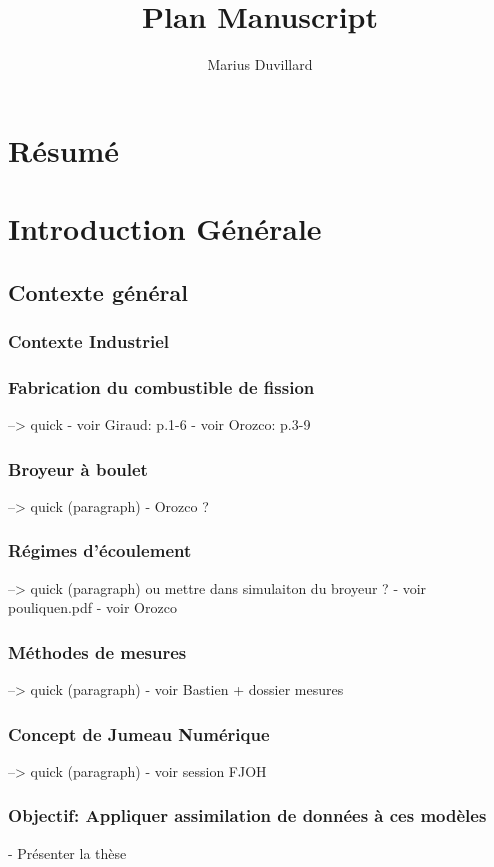 \documentclass{article}
\title{Plan Manuscript}
\author{Marius Duvillard}
\begin{document}
\maketitle
\tableofcontents
\newpage

\section{Résumé}
\section{Introduction Générale}
\subsection{Contexte général}
\subsubsection{Contexte Industriel}
\subsubsection{Fabrication du combustible de fission} --> quick
- voir Giraud: p.1-6
- voir Orozco: p.3-9
\subsubsection{Broyeur à boulet} --> quick (paragraph)
- Orozco ?
\subsubsection{Régimes d'écoulement} --> quick (paragraph) ou mettre dans simulaiton du broyeur ?
- voir pouliquen.pdf
- voir Orozco

\subsubsection{Méthodes de mesures} --> quick (paragraph)
- voir Bastien + dossier mesures

\subsubsection{Concept de Jumeau Numérique} --> quick (paragraph)
- voir session FJOH

\subsubsection{Objectif: Appliquer assimilation de données à ces modèles}
- Présenter la thèse
\end{document}
